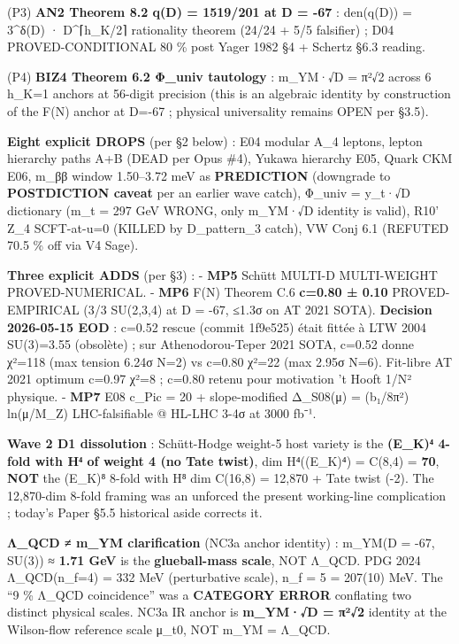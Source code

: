 \documentclass[
  11pt,
  a4paper,
]{article}
\begin{document}
(P3) \textbf{AN2 Theorem 8.2 q(D) = 1519/201 at D = -67} : den(q(D)) = 3\^{}δ(D) · \textbar D\textbar\^{}⌈h\_K/2⌉ rationality theorem (24/24 + 5/5 falsifier) ; D04 PROVED-CONDITIONAL 80 \% post Yager 1982 §4 + Schertz §6.3 reading.

(P4) \textbf{BIZ4 Theorem 6.2 Φ\_univ tautology} : m\_YM·√\textbar D\textbar{} = π²√2 across 6 h\_K=1 anchors at 56-digit precision (this is an algebraic identity by construction of the F(N) anchor at D=-67 ; physical universality remains OPEN per §3.5).

\textbf{Eight explicit DROPS} (per §2 below) : E04 modular A\_4 leptons, lepton hierarchy paths A+B (DEAD per Opus \#4), Yukawa hierarchy E05, Quark CKM E06, m\_ββ window 1.50--3.72 meV as \textbf{PREDICTION} (downgrade to \textbf{POSTDICTION caveat} per an earlier wave catch), Φ\_univ = y\_t·√\textbar D\textbar{} dictionary (m\_t = 297 GeV WRONG, only m\_YM·√\textbar D\textbar{} identity is valid), R10' Z\_4 SCFT-at-u=0 (KILLED by D\_pattern\_3 catch), VW Conj 6.1 (REFUTED 70.5 \% off via V4 Sage).

\textbf{Three explicit ADDS} (per §3) :
- \textbf{MP5} Schütt MULTI-D MULTI-WEIGHT PROVED-NUMERICAL.
- \textbf{MP6} F(N) Theorem C.6 \textbf{c=0.80 ± 0.10} PROVED-EMPIRICAL (3/3 SU(2,3,4) at D = -67, ≤1.3σ on AT 2021 SOTA). \textbf{Decision 2026-05-15 EOD} : c=0.52 rescue (commit 1f9e525) était fittée à LTW 2004 SU(3)=3.55 (obsolète) ; sur Athenodorou-Teper 2021 SOTA, c=0.52 donne χ²=118 (max tension 6.24σ N=2) vs c=0.80 χ²=22 (max 2.95σ N=6). Fit-libre AT 2021 optimum c=0.97 χ²=8 ; c=0.80 retenu pour motivation 't Hooft 1/N² physique.
- \textbf{MP7} E08 c\_Pic = 20 + slope-modified Δ\_S08(μ) = (b₁/8π²) ln(μ/M\_Z) LHC-falsifiable @ HL-LHC 3-4σ at 3000 fb⁻¹.

\textbf{Wave 2 D1 dissolution} : Schütt-Hodge weight-5 host variety is the \textbf{(E\_K)⁴ 4-fold with H⁴ of weight 4 (no Tate twist)}, dim H⁴((E\_K)⁴) = C(8,4) = \textbf{70}, \textbf{NOT} the (E\_K)⁸ 8-fold with H⁸ dim C(16,8) = 12,870 + Tate twist (-2). The 12,870-dim 8-fold framing was an unforced the present working-line complication ; today's Paper §5.5 historical aside corrects it.

\textbf{Λ\_QCD ≠ m\_YM clarification} (NC3a anchor identity) : m\_YM(D = -67, SU(3)) ≈ \textbf{1.71 GeV} is the \textbf{glueball-mass scale}, NOT Λ\_QCD. PDG 2024 Λ\_QCD(n\_f=4) = 332 MeV (perturbative scale), n\_f = 5 = 207(10) MeV. The ``9 \% Λ\_QCD coincidence'' was a \textbf{CATEGORY ERROR} conflating two distinct physical scales. NC3a IR anchor is \textbf{m\_YM·√\textbar D\textbar{} = π²√2} identity at the Wilson-flow reference scale μ\_t0, NOT m\_YM = Λ\_QCD.
\end{document}

